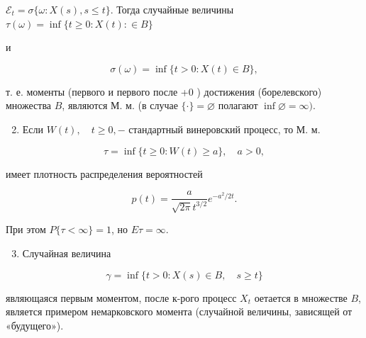 \documentclass[10pt]{article}
\begin{document}
$\mathscr{E}_{t}=\sigma\{\omega: X(s), s \leqslant t\}$. Тогда случайные величины $\tau(\omega)=\inf \{t \geqslant 0: X(t): \in B\}$



и



\[

\sigma(\omega)=\inf \{t>0: X(t) \in B\},

\]



т. е. моменты (первого и первого после +0 ) достижения (борелевского) множества $B$, являются М. м. (в случае $\{\cdot\}=\varnothing$ полагают $\inf \varnothing=\infty)$.



\begin{enumerate}

  \setcounter{enumi}{1}

  \item Если $W(t), \quad t \geqslant 0,-$ стандартный винеровский процесс, то М. м.

\end{enumerate}



\[

\tau=\inf \{t \geqslant 0: W(t) \geqslant a\}, \quad a>0,

\]



имеет плотность распределения вероятностей



\[

p(t)=\frac{a}{\sqrt{2 \pi} t^{3 / 2}} e^{-a^{2} / 2 t} .

\]



При этом $P\{\tau<\infty\}=1$, но $E \tau=\infty$.



\begin{enumerate}

  \setcounter{enumi}{2}

  \item Случайная величина

\end{enumerate}



\[

\gamma=\inf \{t>0: X(s) \in B, \quad s \geqslant t\}

\]



являющаяся первым моментом, после к-рого процесс $X_{t}$ оетается в множестве $B$, является примером немарковского момента (случайной величины, зависящей от «будущего»).
\end{document}
